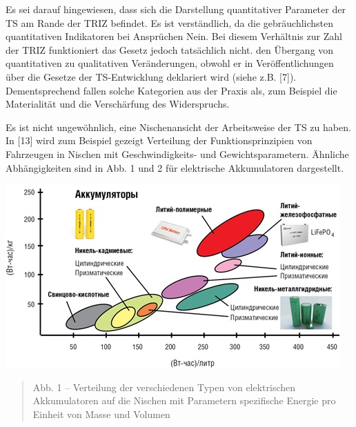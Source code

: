 \documentclass[11pt,a4paper]{article}
\begin{document}
\begin{emph}
  Es sei darauf hingewiesen, dass sich die Darstellung quantitativer Parameter
  der TS am Rande der TRIZ befindet. Es ist verständlich, da die
  gebräuchlichsten quantitativen Indikatoren bei Ansprüchen Nein. Bei diesem
  Verhältnis zur Zahl der TRIZ funktioniert das Gesetz jedoch tatsächlich
  nicht.  den Übergang von quantitativen zu qualitativen Veränderungen, obwohl
  er in Veröffentlichungen über die Gesetze der TS-Entwicklung deklariert wird
  (siehe z.B. [7]). Dementsprechend fallen solche Kategorien aus der Praxis
  als, zum Beispiel die Materialität und die Verschärfung des Widerspruchs.
\end{emph}
Es ist nicht ungewöhnlich, eine Nischenansicht der Arbeitsweise der TS zu
haben. In [13] wird zum Beispiel gezeigt Verteilung der Funktionsprinzipien
von Fahrzeugen in Nischen mit Geschwindigkeits- und Gewichtsparametern.
Ähnliche Abhängigkeiten sind in Abb. 1 und 2 für elektrische Akkumulatoren
dargestellt.
\begin{center}
  \includegraphics[width=.7\textwidth]{2164-1.jpg}
  \begin{quote}
    Abb. 1 -- Verteilung der verschiedenen Typen von elektrischen
    Akkumulatoren auf die Nischen mit Parametern spezifische Energie pro
    Einheit von Masse und Volumen
  \end{quote}
\end{center}
\end{document}
